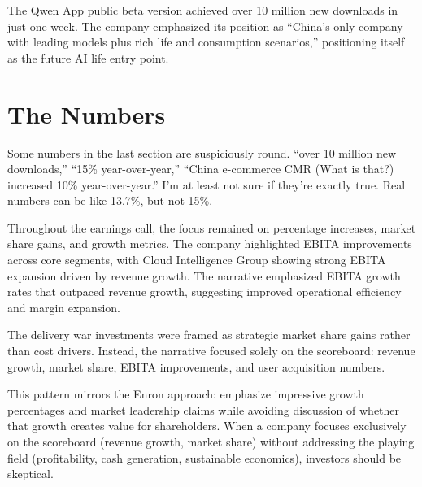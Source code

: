 The Qwen App public beta version achieved over 10 million new downloads in just one week. The company emphasized its position as ``China's only company with leading models plus rich life and consumption scenarios,'' positioning itself as the future AI life entry point.

\section{The Numbers}
Some numbers in the last section are suspiciously round. ``over 10 million new downloads,'' ``15\% year-over-year,'' ``China e-commerce CMR (What is that?) increased 10\% year-over-year.''
I'm at least not sure if they're exactly true. Real numbers can be like 13.7\%, but not 15\%.




Throughout the earnings call, the focus remained on percentage increases, market share gains, and growth metrics. The company highlighted EBITA improvements across core segments, with Cloud Intelligence Group showing strong EBITA expansion driven by revenue growth. The narrative emphasized EBITA growth rates that outpaced revenue growth, suggesting improved operational efficiency and margin expansion.

The delivery war investments were framed as strategic market share gains rather than cost drivers. Instead, the narrative focused solely on the scoreboard: revenue growth, market share, EBITA improvements, and user acquisition numbers.

This pattern mirrors the Enron approach: emphasize impressive growth percentages and market leadership claims while avoiding discussion of whether that growth creates value for shareholders. When a company focuses exclusively on the scoreboard (revenue growth, market share) without addressing the playing field (profitability, cash generation, sustainable economics), investors should be skeptical.